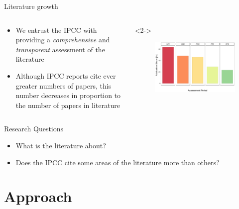\documentclass[9pt]{beamer}
\begin{document}
\begin{frame}{Literature growth}

\begin{columns}
	\begin{column}{0.382\linewidth}
	\begin{itemize}
		\item<1->We entrust the IPCC with providing a \textit{comprehensive} and \textit{transparent} assessment of the literature 
		\item<2->Although IPCC reports cite ever greater numbers of papers, this number decreases in proportion to the number of papers in literature
		
	\end{itemize}
\end{column}
	\begin{column}{0.618\linewidth}<2->
		\begin{figure}
			\includegraphics[width=\linewidth]{../plots/wos_IPCC_shares.png}
			\caption{\citep{Minx2017l}}
		\end{figure}
	\end{column}
\end{columns}

\end{frame}

\begin{frame}{Research Questions}
\begin{itemize}
	\item<1-> What is the literature about?
	\item<2-> Does the IPCC cite some areas of the literature more than others?
\end{itemize}
\end{frame}

\section{Approach}
\end{document}
